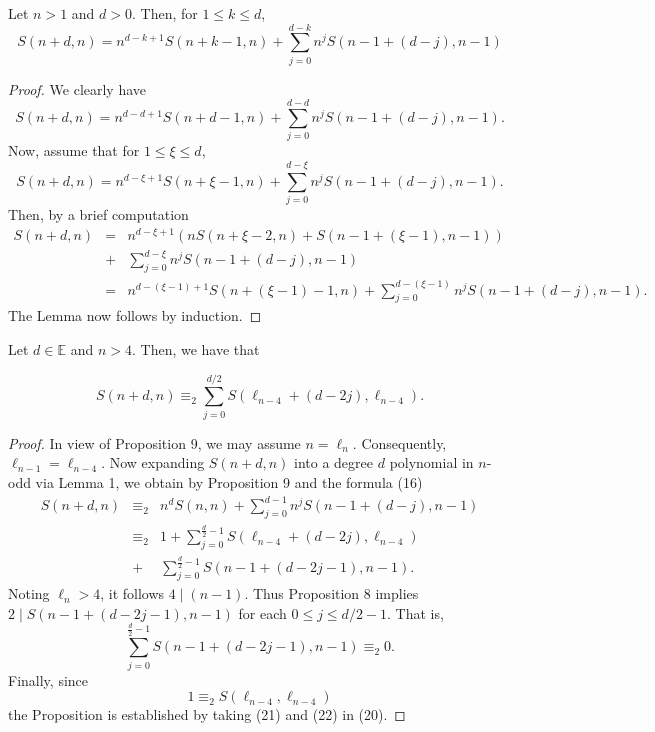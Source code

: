 \documentclass[]{amsart}
\begin{document}
\begin{lem}
Let $n > 1$ and $d > 0$.  Then, for \hspace{0.5mm} $1 \leq k \leq d$,
\[ S(n+d,n) = n^{d-k+1}S(n+k-1,n) + \sum_{j=0}^{d-k}n^{j}S(n-1+(d-j),n-1)\]
\end{lem}
\begin{proof}
We clearly have
\[ S(n+d,n) = n^{d-d+1}S(n+d-1,n) + \sum_{j=0}^{d-d}n^{j}S(n-1+(d-j),n-1). \]
Now, assume that for $1 \leq \xi \leq d$,
\[ S(n+d,n) = n^{d-\xi+1}S(n+\xi-1,n) + \sum_{j=0}^{d-\xi}n^{j}S(n-1+(d-j),n-1). \]
Then, by a brief computation
\begin{eqnarray}
S(n+d,n) & = & n^{d-\xi+1}(nS(n+\xi-2,n) + S(n-1+(\xi-1),n-1)) \nonumber \\ \nonumber
		 & + & \sum_{j=0}^{d-\xi}n^{j}S(n-1+(d-j),n-1) \nonumber \\ \nonumber
		 & = & n^{d-(\xi-1)+1}S(n+(\xi-1)-1,n) + \sum_{j=0}^{d-(\xi-1)}n^{j}S(n-1+(d-j),n-1). \nonumber
\end{eqnarray}
The Lemma now follows by induction.
\end{proof}
\begin{prop}
Let $d \in \mathbb{E}$ and $n > 4$.  Then, we have that
\end{prop}
\vspace{-12pt}
\[ S(n+d,n) \equiv_{2} \sum_{j=0}^{d/2}S(\ell_{n-4}+(d-2j),\ell_{n-4}). \]
\begin{proof}
In view of Proposition 9, we may assume $n = \ell_{n}$.  Consequently, $\ell_{n-1} = \ell_{n-4}$.  Now expanding $S(n+d,n)$ into a degree $d$ polynomial in $n$-odd via Lemma 1, we obtain by Proposition 9 and the formula (16)
\begin{eqnarray}
S(n+d,n) & \equiv_{2} & n^{d}S(n,n) + \sum_{j=0}^{d-1}n^{j}S(n-1+(d-j),n-1) \nonumber \\ 
         & \equiv_{2} & 1 + \sum_{j=0}^{\frac{d}{2}-1}S(\ell_{n-4}+(d-2j),\ell_{n-4}) \\
         &   +        & \sum_{j=0}^{\frac{d}{2}-1}S(n-1+(d-2j-1),n-1). \nonumber
\end{eqnarray}
Noting $\ell_{n} > 4$, it follows $4 \mid (n-1)$.  Thus Proposition 8 implies $2 \mid S(n-1+(d-2j-1),n-1)$ for each $0 \leq j \leq d/2-1$.  
That is,
\begin{equation}
\sum_{j=0}^{\frac{d}{2}-1}S(n-1+(d-2j-1),n-1) \equiv_{2} 0.
\end{equation}
Finally, since
\begin{equation}
1 \equiv_{2} S(\ell_{n-4},\ell_{n-4})
\end{equation}
the Proposition is established by taking (21) and (22) in (20).
\end{proof}
\end{document}
